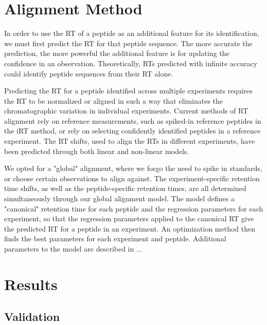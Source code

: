 \begin{spacing}{1.55}
\section{Alignment Method}

In order to use the RT of a peptide as an additional feature for its identification, we must first predict the RT for that peptide sequence. The more accurate the prediction, the more powerful the additional feature is for updating the confidence in an observation. Theoretically, RTs predicted with infinite accuracy could identify peptide sequences from their RT alone.

Predicting the RT for a peptide identified across multiple experiments requires the RT to be normalized or aligned in such a way that eliminates the chromatographic variation in individual experiments. Current methods of RT alignment rely on reference measurements, such as spiked-in reference peptides in the iRT method, or rely on selecting confidently identified peptides in a reference experiment. The RT shifts, used to align the RTs in different experiments, have been predicted through both linear and non-linear models.


We opted for a "global" alignment, where we forgo the need to spike in standards, or choose certain observations to align against. The experiment-specific retention time shifts, as well as the peptide-specific retention times, are all determined simultaneously through our global alignment model. The model defines a "canonical" retention time for each peptide and the regression parameters for each experiment, so that the regression parameters applied to the canonical RT give the predicted RT for a peptide in an experiment. An optimization method then finds the best parameters for each experiment and peptide. Additional parameters to the model are described in ...

\section{Results}

\subsection{Validation}


\end{spacing}

